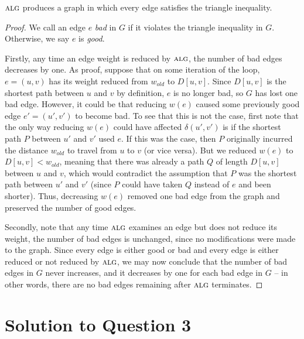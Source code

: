 \documentclass[11pt]{article}
\newcommand{\alg}{\textsc{alg}}
\begin{document}
 $\alg$ produces a graph in which every edge satisfies the triangle inequality.
\begin{proof}
  We call an edge $e$ {\em bad\/} in $G$ if it violates the triangle inequality in $G$.
  Otherwise, we say $e$ is {\em good}.

  Firstly, any time an edge weight is reduced by $\alg$, the number of bad edges decreases by one.
  As proof, suppose that on some iteration of the loop, $e = (u, v)$ has its weight reduced from $w_{old}$ to $D[u, v]$.
  Since $D[u, v]$ is the shortest path between $u$ and $v$ by definition, $e$ is no longer bad, so $G$ has lost one bad edge.
  However, it could be that reducing $w(e)$ caused some previously good edge $e' = (u', v')$ to become bad.
  To see that this is not the case, first note that the only way reducing $w(e)$ could have affected $\delta(u', v')$ is if the shortest path $P$ between $u'$ and $v'$ used $e$.
  If this was the case, then $P$ originally incurred the distance $w_{old}$ to travel from $u$ to $v$ (or vice versa).
  But we reduced $w(e)$ to $D[u, v] < w_{old}$, meaning that there was already a path $Q$ of length $D[u, v]$ between $u$ and $v$, which would contradict the assumption that $P$ was the shortest path between $u'$ and $v'$ (since $P$ could have taken $Q$ instead of $e$ and been shorter).
  Thus, decreasing $w(e)$ removed one bad edge from the graph and preserved the number of good edges.

  Secondly, note that any time $\alg$ examines an edge but does not reduce its weight, the number of bad edges is unchanged, since no modifications were made to the graph.
  Since every edge is either good or bad and every edge is either reduced or not reduced by $\alg$, we may now conclude that the number of bad edges in $G$ never increases, and it decreases by one for each bad edge in $G$ -- in other words, there are no bad edges remaining after $\alg$ terminates.
\end{proof}

\newpage
\section{Solution to Question 3}

\end{document}
